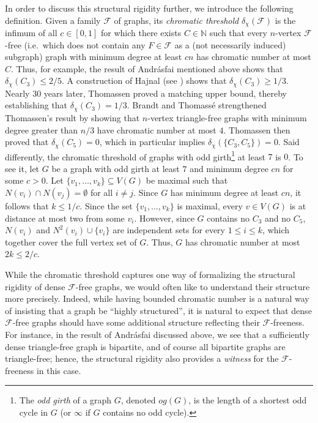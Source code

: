 \documentclass{article}
\begin{document}
In order to discuss this structural rigidity further, we introduce the following definition.
Given a family $\mathcal{F}$ of graphs, its \emph{chromatic threshold} $\delta_{\chi}(\mathcal{F})$ is the infimum of all $c \in [0, 1]$ for which there exists $C \in \mathbb{N}$ such that every $n$-vertex $\mathcal{F}$-free (i.e.\ which does not contain any $F \in \mathcal{F}$ as a (not necessarily induced) subgraph) graph with minimum degree at least $cn$ has chromatic number at most $C$. Thus, for example, the result of Andr\'asfai mentioned above shows that $\delta_\chi(C_3)\leq 2/5$.
A construction of Hajnal (see \cite{ES73}) shows that $\delta_{\chi}(C_3) \geq 1/3$.
Nearly 30 years later, Thomassen \cite{T02} proved a matching upper bound, thereby establishing  that $\delta_{\chi}(C_3) = 1/3$.
Brandt and Thomassé \cite{BT04} strengthened Thomassen's result by showing that $n$-vertex triangle-free graphs with minimum degree greater than $n/3$ have chromatic number at most $4$.
Thomassen \cite{T07} then proved that $\delta_{\chi}(C_5)=0$, which in particular implies $\delta_\chi(\{C_3,C_5\})=0$.
Said differently, the chromatic threshold of graphs with odd girth\footnote{The \emph{odd girth} of a graph $G$, denoted $og(G)$, is the length of a shortest odd cycle in $G$ (or $\infty$ if $G$ contains no odd cycle).} at least $7$ is $0$.
To see it, let $G$ be a graph with odd girth at least $7$ and minimum degree $cn$ for some $c > 0$. 
Let $\{v_1, \ldots, v_k\} \subseteq V(G)$ be maximal such that $N(v_i) \cap N(v_j) = \emptyset$ for all $i \neq j$. 
Since $G$ has minimum degree at least $cn$, it follows that $k \leq 1/c$. 
Since the set $\{v_1, \ldots, v_k\}$ is maximal, every $v \in V(G)$ is at distance at most two from some $v_i$. 
However, since $G$ contains no $C_3$ and no $C_5$, $N(v_i)$ and $N^2(v_i) \cup \{v_i\}$ are independent sets for every $1\le i\le k$, which together cover the full vertex set of $G$. 
Thus, $G$ has chromatic number at most $2k\le 2/c$.

While the chromatic threshold captures one way of formalizing the structural rigidity of dense $\mathcal F$-free graphs, we would often like to understand their structure more precisely. Indeed, while having bounded chromatic number is a natural way of insisting that a graph be ``highly structured'', it is natural to expect that dense $\mathcal F$-free graphs should have some additional structure reflecting their $\mathcal F$-freeness. For instance, in the result of Andr\'asfai discussed above, we see that a sufficiently dense triangle-free graph is bipartite, and of course all bipartite graphs are triangle-free; hence, the structural rigidity also provides a \emph{witness} for the $\mathcal F$-freeness in this case.
\end{document}

